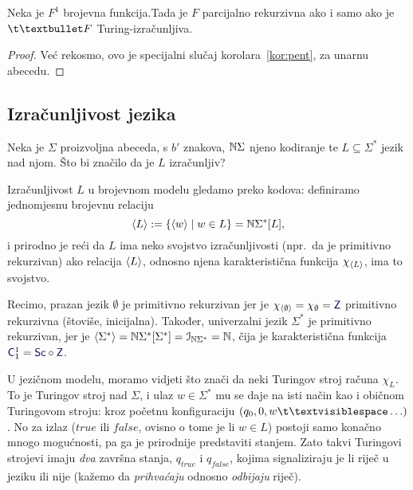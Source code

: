 \begin{korolar}[{name=[unarno reprezentirane brojevne funkcije u različitim modelima]}]\label{kor:peuf}
Neka je $F^1$\! brojevna funkcija.\newline Tada je $F$ parcijalno rekurzivna ako i samo ako je $\t\textbullet F$ Turing-izračunljiva.
\end{korolar}
\begin{proof}
Već rekosmo, ovo je specijalni slučaj korolara~\ref{kor:pent}, za unarnu abecedu.
\end{proof}

\subsection{Izračunljivost jezika}\label{sec:Todl}

Neka je $\Sigma$ proizvoljna abeceda, s $b'$ znakova, ${\mathbb N}\Sigma$ njeno kodiranje te $L\subseteq\Sigma^*$ jezik nad njom. Što bi značilo da je $L$ izračunljiv?

Izračunljivost $L$ u brojevnom modelu gledamo preko kodova: definiramo jednomjesnu brojevnu relaciju
\begin{equation}\label{eq:kodLdef}
    \langle L\rangle:=\{\langle w\rangle\mid w\in L\}={\mathbb N}\Sigma^*[L]\text,
\end{equation}
i prirodno je reći da $L$ ima neko svojstvo izračunljivosti (npr.\ da je primitivno rekurzivan) ako relacija $\langle L\rangle$, odnosno njena karakteristična funkcija $\chi_{\langle L\rangle}$, ima to svojstvo.

Recimo, prazan jezik $\emptyset$ je primitivno rekurzivan jer je $\chi_{\kr\emptyset}=\chi_\emptyset=\f Z$ primitivno rekurzivna (štoviše, inicijalna). Također, univerzalni jezik $\Sigma^*$ je primitivno rekurzivan, jer je $\langle\Sigma^*\rangle={\mathbb N}\Sigma^*[\Sigma^*]=\mathcal I_{{\mathbb N}\Sigma^*}={\mathbb N}$, čija je karakteristična funkcija $\f C_1^1=\f{Sc}\circ\f Z$.

U jezičnom modelu, moramo vidjeti što znači da neki Turingov stroj računa $\chi_L$. To je Turingov stroj nad $\Sigma$, i ulaz $w\in\Sigma^*$ mu se daje na isti način kao i običnom Turingovom stroju: kroz početnu konfiguraciju $(q_0,0,w\bl\ldots)$. No za izlaz ($\mathit{true}$ ili $\mathit{false}$, ovisno o tome je li $w\in L$) postoji samo konačno mnogo mogućnosti, pa ga je prirodnije predstaviti stanjem. Zato takvi Turingovi strojevi imaju \emph{dva} završna stanja, $q_{\mathit{true}}$ i $q_{\mathit{false}}$, kojima signaliziraju je li riječ u jeziku ili nije (kažemo da \emph{prihvaćaju} odnosno \emph{odbijaju} riječ).

